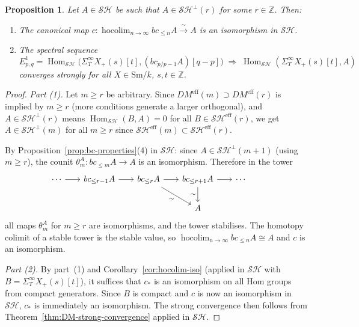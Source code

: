 \documentclass[12pt,a4paper]{article}
\newtheorem{proposition}[theorem]{Proposition}
\theoremstyle{definition}
\newcommand{\Sm}{\mathrm{Sm}}
\newcommand{\SH}{\mathcal{SH}}
\newcommand{\hocolim}{\operatorname*{hocolim}}
\newcommand{\Hom}{\operatorname{Hom}}
\newcommand{\Z}{\mathbb{Z}}
\begin{document}
\begin{proposition}\label{prop:SHconvergence}
Let $A\in\SH$ be such that $A\in\SH^\perp(r)$ for some $r\in\Z$.  Then:
\begin{enumerate}
  \item The canonical map $c:\hocolim_{n\to\infty}bc_{\leq n}A\xrightarrow{\;\sim\;} A$
    is an isomorphism in $\SH$.
  \item The spectral sequence
    \[
      E^1_{p,q} = \Hom_{\SH}\!\bigl(\Sigma_T^\infty X_+(s)[t],
        (bc_{p/p-1}A)[q-p]\bigr)
      \;\Rightarrow\;\Hom_{\SH}(\Sigma_T^\infty X_+(s)[t],A)
    \]
    converges strongly for all $X\in\Sm/k$, $s,t\in\Z$.
\end{enumerate}
\end{proposition}
\begin{proof}
\textit{Part (1).}  Let $m\geq r$ be arbitrary.  Since
$DM^{\mathrm{eff}}(m)\supset DM^{\mathrm{eff}}(r)$ is implied by $m\geq r$ (more conditions
generate a larger orthogonal), and $A\in\SH^\perp(r)$ means $\Hom_\SH(B,A)=0$
for all $B\in\SH^{\mathrm{eff}}(r)$, we get $A\in\SH^\perp(m)$ for all $m\geq r$
since $\SH^{\mathrm{eff}}(m)\subset\SH^{\mathrm{eff}}(r)$.

By Proposition~\ref{prop:bc-properties}(4) in $\SH$: since $A\in\SH^\perp(m+1)$
(using $m\geq r$), the counit $\theta_m^A:bc_{\leq m}A\to A$ is an isomorphism.
Therefore in the tower
\[
\begin{tikzcd}[column sep=1.8em]
  \cdots \ar[r] & bc_{\leq r-1}A \ar[r] & bc_{\leq r}A \ar[r]
    \ar[dr,"\sim"'] & bc_{\leq r+1}A \ar[r] \ar[d,"\sim"'] & \cdots \\
  &&& A &&
\end{tikzcd}
\]
all maps $\theta_m^A$ for $m\geq r$ are isomorphisms, and the tower stabilises.
The homotopy colimit of a stable tower is the stable value, so
$\hocolim_{n\to\infty}bc_{\leq n}A\cong A$ and $c$ is an isomorphism.

\textit{Part (2).}  By part~(1) and Corollary~\ref{cor:hocolim-iso} (applied in
$\SH$ with $B=\Sigma_T^\infty X_+(s)[t]$), it suffices that $c_*$ is an isomorphism
on all Hom groups from compact generators.  Since $B$ is compact and $c$ is now an
isomorphism in $\SH$, $c_*$ is immediately an isomorphism.  The strong convergence
then follows from Theorem~\ref{thm:DM-strong-convergence} applied in $\SH$.
\end{proof}
\end{document}
